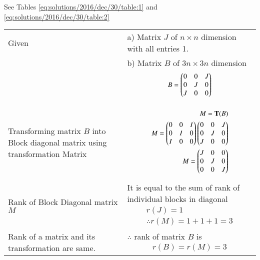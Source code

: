 See Tables 
\ref{eq:solutions/2016/dec/30/table:1}
and
\ref{eq:solutions/2016/dec/30/table:2}

\begin{table*}[ht!]
\begin{center}
\begin{tabular}{ | m{3cm} | m{5cm}| } \hline 
Given  &  a) Matrix $J$ of $n \times n$ dimension with all entries 1.\\&  
b) Matrix $B$ of $3n \times 3n$ dimension { 
\begin{align*}
B = \begin{pmatrix}0&0&J\\0&J&0\\J&0&0\end{pmatrix}
\end{align*}}\\  \hline
Transforming matrix $B$ into Block diagonal matrix using transformation Matrix & {\begin{align*}
M = \mathbf{T}(B)\\
M = \begin{pmatrix}0&0&I\\0&I&0\\I&0&0\end{pmatrix} \begin{pmatrix}0&0&J\\0&J&0\\J&0&0\end{pmatrix}\\
M = \begin{pmatrix}J&0&0\\0&J&0\\0&0&J\end{pmatrix}
\end{align*}}\\  \hline
Rank of Block Diagonal matrix $M$ & It is equal to the sum of rank of individual blocks in diagonal{\begin{align*}
r(J) = 1\\
\therefore r(M) = 1 + 1 + 1 = 3
\end{align*}}\\ \hline
Rank of a matrix and its transformation are same. & $\therefore$ rank of matrix $B$ is {\begin{align*}r(B) = r(M) =3
\end{align*}}\\ \hline 
\end{tabular}
\end{center}
\caption{}
\label{eq:solutions/2016/dec/30/table:1}
\end{table*}

